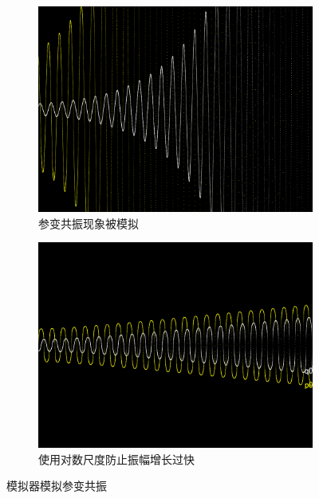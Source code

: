 \documentclass[12pt]{article}
\begin{document}
\begin{figure}[h]
  \centering
  \begin{subfigure}[b]{0.45\linewidth}
    \includegraphics[width=\linewidth]{parametric_resonance.png}
    \caption{参变共振现象被模拟}
    \label{fig:parametric_a}
  \end{subfigure}
  \begin{subfigure}[b]{0.45\linewidth}
    \includegraphics[width=\linewidth]{parametric_resonance_logarithmic.png}
    \caption{使用对数尺度防止振幅增长过快}
    \label{fig:parametric_b}
  \end{subfigure}
  \caption{模拟器模拟参变共振}
  \label{fig:parametric}
\end{figure}
\end{document}
